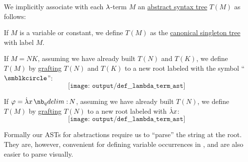 \begin{definition}\label{def:lambda_term_ast}\mimprovised
  We implicitly associate with each \( {\mathrm \lambda} \)-term \( M \) an \hyperref[con:abstract_syntax_tree]{abstract syntax tree} \( T(M) \) as follows:
  \begin{thmenum}
     If \( M \) is a variable or constant, we define \( T(M) \) as the \hyperref[def:canonical_singleton_tree]{canonical singleton tree} with label \( M \).

     If \( M = NK \), assuming we have already built \( T(N) \) and \( T(K) \), we define \( T(M) \) by \hyperref[def:ordered_tree_grafting_product]{grafting} \( T(N) \) and \( T(K) \) to a new root labeled with the symbol \enquote{\( \anon \)}:
    \begin{equation*}
      \texttt{[image: output/def\_\_lambda\_term\_ast]}
    \end{equation*}

     If \( \varphi = \qabs x N \), assuming we have already built \( T(N) \), we define \( T(M) \) by \hyperref[def:ordered_tree_grafting_product]{grafting} \( T(N) \) to a new root labeled with \( \dot{{\mathrm \lambda}} x \):
    \begin{equation*}
      \texttt{[image: output/def\_\_lambda\_term\_ast]}
    \end{equation*}
  \end{thmenum}
\end{definition}
\begin{comments}
  \item Formally our ASTs for abstractions require us to \enquote{parse} the string at the root. They are, however, convenient for defining variable occurrences in , and are also easier to parse visually.
\end{comments}

